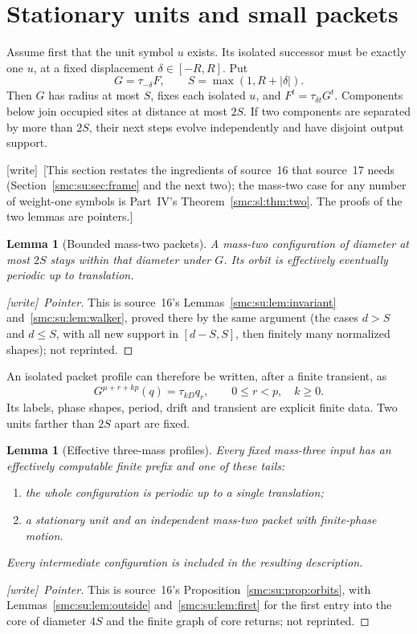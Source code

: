 \documentclass[11pt,letterpaper]{article}
\numberwithin{equation}{section}
\newtheorem{lemma}[theorem]{Lemma}
\theoremstyle{definition}
\theoremstyle{remark}
\newcommand{\wtag}{\textup{[write]}}
\begin{document}
\section{Stationary units and small packets}\label{smc:fm:sec:packets}
Assume first that the unit symbol $u$ exists. Its isolated successor must be
exactly one $u$, at a fixed displacement $\delta\in[-R,R]$. Put
\[
 G=\tau_{-\delta}F,\qquad S=\max(1,R+|\delta|).
\]
Then $G$ has radius at most $S$, fixes each isolated $u$, and
$F^t=\tau_{\delta t}G^t$. Components below join occupied sites at distance
at most $2S$. If two components are separated by more than $2S$, their next
steps evolve independently and have disjoint output support.

\wtag\ [This section restates the ingredients of source~16 that source~17 needs (Section~\ref{smc:su:sec:frame} and the next two); the mass-two case for any number of weight-one symbols is Part~IV's Theorem~\ref{smc:sl:thm:two}. The proofs of the two lemmas are pointers.]

\begin{lemma}[Bounded mass-two packets]\label{smc:fm:lem:two}
A mass-two configuration of diameter at most $2S$ stays within that diameter
under $G$. Its orbit is effectively eventually periodic up to translation.
\end{lemma}
\begin{proof}[\wtag\ Pointer]
This is source~16's Lemmas~\ref{smc:su:lem:invariant} and~\ref{smc:su:lem:walker}, proved there by the same argument (the cases $d>S$ and $d\le S$, with all new support in $[d-S,S]$, then finitely many normalized shapes); not reprinted.
\end{proof}

An isolated packet profile can therefore be written, after a finite transient,
as
\begin{equation}
 G^{\mu+r+kp}(q)=\tau_{kD}q_r,
 \qquad 0\le r<p,\quad k\ge0.                 \label{smc:fm:eq:profile}
\end{equation}
Its labels, phase shapes, period, drift and transient are explicit finite data.
Two units farther than $2S$ apart are fixed.

\begin{lemma}[Effective three-mass profiles]\label{smc:fm:lem:three}
Every fixed mass-three input has an effectively computable finite prefix and
one of these tails:
\begin{enumerate}
\item the whole configuration is periodic up to a single translation;
\item a stationary unit and an independent mass-two packet with finite-phase
motion.
\end{enumerate}
Every intermediate configuration is included in the resulting description.
\end{lemma}
\begin{proof}[\wtag\ Pointer]
This is source~16's Proposition~\ref{smc:su:prop:orbits}, with Lemmas~\ref{smc:su:lem:outside} and~\ref{smc:su:lem:first} for the first entry into the core of diameter $4S$ and the finite graph of core returns; not reprinted.
\end{proof}
\end{document}
